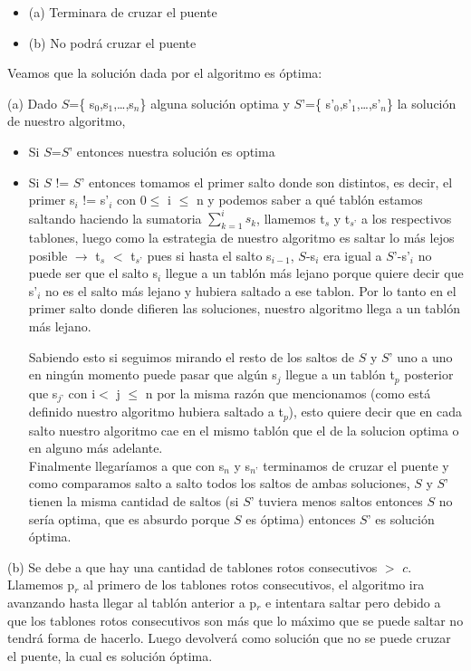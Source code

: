 \begin{itemize}
	\item	(a) Terminara de cruzar el puente
	\item	(b) No podrá cruzar el puente
\end{itemize}

Veamos que la solución dada por el algoritmo es óptima:

(a) Dado $S$=\{ s$_{0}$,s$_{1}$,…,s$_{n}$\} alguna solución optima y $S’$=\{ s’$_{0}$,s’$_{1}$,…,s’$_{n}$\} la solución de nuestro algoritmo,

\begin{itemize}
	\item	Si $S$=$S’$ entonces nuestra solución es optima
	
	\item	Si $S$ != $S’$ entonces tomamos el primer salto donde son distintos, es decir, el primer s$_{i}$ != s’$_{i}$ con 0$\leq$ i $\leq$ n y podemos saber a qué tablón estamos saltando haciendo la sumatoria $\sum_{k=1}^{i} s_{k}$, llamemos t$_{s}$ y t$_{s’}$ a los respectivos tablones, luego como la estrategia de nuestro algoritmo es saltar lo más lejos posible $\rightarrow$ t$_{s}$ $<$ t$_{s’}$ pues si hasta el salto s$_{i-1}$, $S$-s$_{i}$ era igual a $S’$-s’$_{i}$ no puede ser que el salto s$_{i}$ llegue a un tablón más lejano porque quiere decir que s’$_{i}$ no es el salto más lejano y hubiera saltado a ese tablon. Por lo tanto en el primer salto donde difieren las soluciones, nuestro algoritmo llega a un tablón más lejano.
	
	Sabiendo esto si seguimos mirando el resto de los saltos de $S$ y $S’$ uno a uno en ningún momento puede pasar que algún s$_{j}$ llegue a un tablón t$_{p}$ posterior que s$_{j’}$ con i$<$ j $\leq$ n por la misma razón que mencionamos (como está definido nuestro algoritmo hubiera saltado a t$_{p}$), esto quiere decir que en cada salto nuestro algoritmo cae en el mismo tablón que el de la solucion optima o en alguno más adelante. \\
Finalmente llegaríamos a que con s$_{n}$ y s$_{n’}$ terminamos de cruzar el puente y como comparamos salto a salto todos los saltos de ambas soluciones, $S$ y $S’$ tienen la misma cantidad de saltos (si $S’$ tuviera menos saltos entonces $S$ no sería optima, que es absurdo porque $S$ es óptima) entonces $S’$ es solución óptima.
\end{itemize}

(b) Se debe a que hay una cantidad de tablones rotos consecutivos $>$ $c$.
Llamemos p$_{r}$ al primero de los tablones rotos consecutivos, el algoritmo ira avanzando hasta llegar al tablón anterior a p$_{r}$ e intentara saltar pero debido a que los tablones rotos consecutivos son más que lo máximo que se puede saltar no tendrá forma de hacerlo. Luego devolverá como solución que no se puede cruzar el puente, la cual es solución óptima.
 


